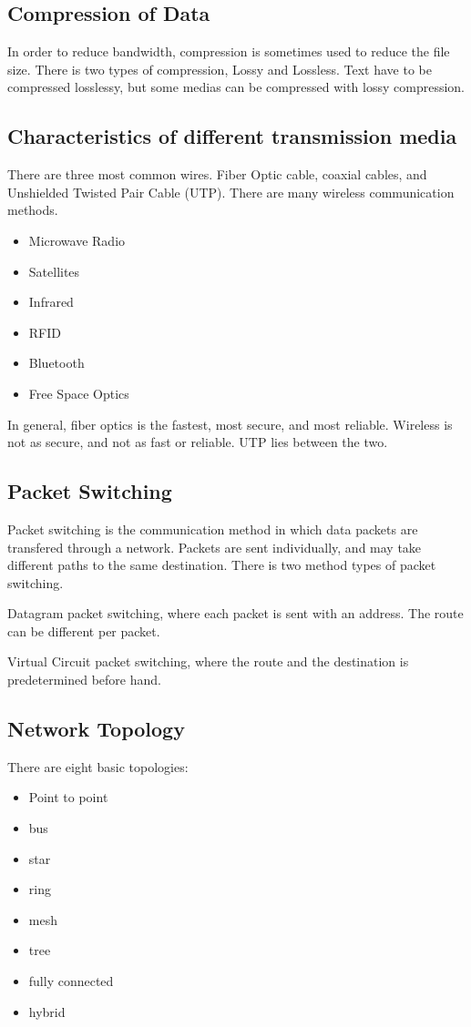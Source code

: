 \documentclass[../notes.tex]{subfiles}
\begin{document}
\subsection{Compression of Data}
In order to reduce bandwidth, compression is sometimes used to reduce the file size.
There is two types of compression, Lossy and Lossless.
Text have to be compressed losslessy, but some medias can be compressed with lossy compression.

\subsection{Characteristics of different transmission media}
There are three most common wires.
Fiber Optic cable, coaxial cables, and Unshielded Twisted Pair Cable (UTP).
There are many wireless communication methods.
\begin{itemize}
	\item Microwave Radio
	\item Satellites
	\item Infrared
	\item RFID
	\item Bluetooth
	\item Free Space Optics
\end{itemize}

In general, fiber optics is the fastest, most secure, and most reliable.
Wireless is not as secure, and not as fast or reliable.
UTP lies between the two.

\subsection{Packet Switching}
Packet switching is the communication method in which data packets are transfered through a network.
Packets are sent individually, and may take different paths to the same destination.
There is two method types of packet switching.

Datagram packet switching, where each packet is sent with an address. 
The route can be different per packet.

Virtual Circuit packet switching, where the route and the destination is predetermined before hand.

\subsection{Network Topology}
There are eight basic topologies:
\begin{itemize}
	\item Point to point
	\item bus
	\item star
	\item ring
	\item mesh
	\item tree
	\item fully connected
	\item hybrid
\end{itemize}
\end{document}
